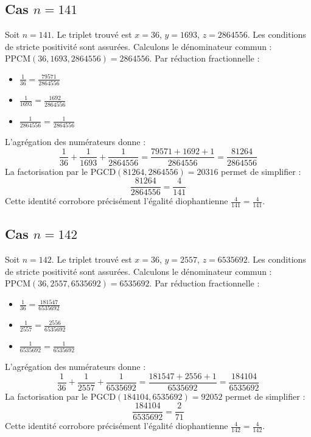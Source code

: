 \documentclass[11pt,a4paper]{article}
\begin{document}
\subsection{Cas $n = 141$}
Soit $n = 141$. Le triplet trouvé est $x = 36$, $y = 1693$, $z = 2864556$.
Les conditions de stricte positivité sont assurées.
Calculons le dénominateur commun : $\text{PPCM}(36, 1693, 2864556) = 2864556$.
Par réduction fractionnelle :
\begin{itemize}
    \item $\frac{1}{36} = \frac{79571}{2864556}$
    \item $\frac{1}{1693} = \frac{1692}{2864556}$
    \item $\frac{1}{2864556} = \frac{1}{2864556}$
\end{itemize}
L'agrégation des numérateurs donne :
$$ \frac{1}{36} + \frac{1}{1693} + \frac{1}{2864556} = \frac{79571 + 1692 + 1}{2864556} = \frac{81264}{2864556} $$
La factorisation par le $\text{PGCD}(81264, 2864556) = 20316$ permet de simplifier :
$$ \frac{81264}{2864556} = \frac{4}{141} $$
Cette identité corrobore précisément l'égalité diophantienne $\frac{4}{141} = \frac{4}{141}$.

\subsection{Cas $n = 142$}
Soit $n = 142$. Le triplet trouvé est $x = 36$, $y = 2557$, $z = 6535692$.
Les conditions de stricte positivité sont assurées.
Calculons le dénominateur commun : $\text{PPCM}(36, 2557, 6535692) = 6535692$.
Par réduction fractionnelle :
\begin{itemize}
    \item $\frac{1}{36} = \frac{181547}{6535692}$
    \item $\frac{1}{2557} = \frac{2556}{6535692}$
    \item $\frac{1}{6535692} = \frac{1}{6535692}$
\end{itemize}
L'agrégation des numérateurs donne :
$$ \frac{1}{36} + \frac{1}{2557} + \frac{1}{6535692} = \frac{181547 + 2556 + 1}{6535692} = \frac{184104}{6535692} $$
La factorisation par le $\text{PGCD}(184104, 6535692) = 92052$ permet de simplifier :
$$ \frac{184104}{6535692} = \frac{2}{71} $$
Cette identité corrobore précisément l'égalité diophantienne $\frac{4}{142} = \frac{4}{142}$.
\end{document}
